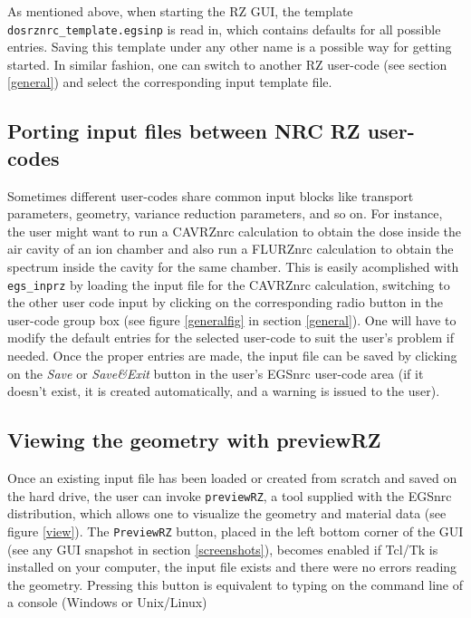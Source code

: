\documentclass[12pt,twoside]{article}   %
\begin{document}
As mentioned above, when starting the RZ GUI, the template {\tt dosrznrc\_template.egsinp} is
read in, which contains defaults for all possible entries. Saving this template under any other
name is a possible way for getting started. In similar fashion, one can switch to another RZ
user-code (see section \ref{general}) and select the corresponding input template file.

\subsection{Porting input files between NRC RZ user-codes}
\label{modifying}

 Sometimes different user-codes share common input blocks like transport parameters,
 geometry, variance reduction parameters, and so on. For instance,
 the user might want to run a CAVRZnrc calculation to obtain the dose inside the air
 cavity of an ion chamber and also run a FLURZnrc calculation to obtain the spectrum
 inside the cavity for the same chamber. This is easily acomplished with {\tt egs\_inprz}
 by loading the input file for the CAVRZnrc calculation, switching to the other user
 code input by  clicking on the corresponding radio button in
 the user-code group box (see figure \ref{generalfig} in section \ref{general}).
One will have to modify the default entries for the selected user-code to suit the user's
problem if needed. Once the proper entries are made, the input file can be saved by
clicking on the {\em Save} or {\em Save\&Exit} button
in the user's EGSnrc user-code area (if it doesn't exist, it is created automatically,
 and a warning is issued to the user).\\

\subsection{Viewing the geometry with previewRZ}

Once an existing input file has been loaded or created from scratch and saved on
the hard drive,
the user can invoke
{\tt previewRZ}, a tool supplied with the EGSnrc distribution, which allows one
to visualize the geometry and material data (see figure \ref{view}).
The {\tt PreviewRZ} button, placed in the left bottom corner of the GUI
(see any GUI snapshot in section \ref{screenshots}),
becomes enabled if Tcl/Tk is installed on your computer, the input file exists
and there were no errors reading the geometry. Pressing this button is equivalent
to typing on the command line of a console (Windows or Unix/Linux)
\end{document}
